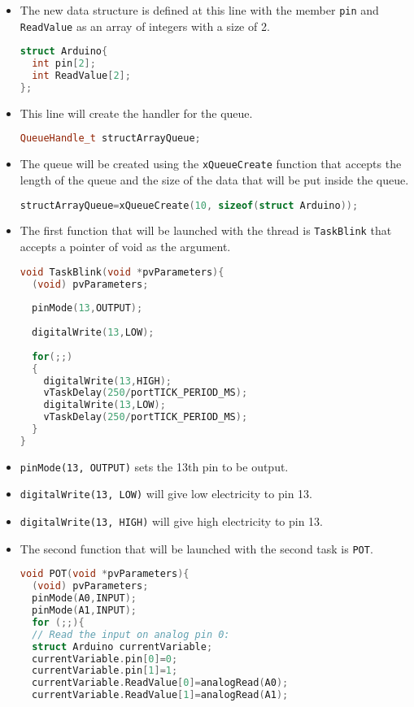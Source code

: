 \documentclass{article}
\begin{document}
\begin{itemize}
    \item The new data structure is defined at this line with the member \texttt{pin} and \texttt{ReadValue} as an array of integers with a size of 2.
\begin{lstlisting}[language=C++,basicstyle=\ttfamily\footnotesize]
struct Arduino{
  int pin[2];
  int ReadValue[2];
};
\end{lstlisting}

    \item This line will create the handler for the queue.
\begin{lstlisting}[language=C++,basicstyle=\ttfamily\footnotesize]
QueueHandle_t structArrayQueue;
\end{lstlisting}

    \item The queue will be created using the \texttt{xQueueCreate} function that accepts the length of the queue and the size of the data that will be put inside the queue.
\begin{lstlisting}[language=C++,basicstyle=\ttfamily\footnotesize]
structArrayQueue=xQueueCreate(10, sizeof(struct Arduino));
\end{lstlisting}

    \item The first function that will be launched with the thread is \texttt{TaskBlink} that accepts a pointer of void as the argument.
\begin{lstlisting}[language=C++,basicstyle=\ttfamily\footnotesize]
void TaskBlink(void *pvParameters){
  (void) pvParameters;
  
  pinMode(13,OUTPUT);
  
  digitalWrite(13,LOW);
  
  for(;;)
  {
    digitalWrite(13,HIGH);
    vTaskDelay(250/portTICK_PERIOD_MS);
    digitalWrite(13,LOW);
    vTaskDelay(250/portTICK_PERIOD_MS);
  }
}
\end{lstlisting}

    \item \texttt{pinMode(13, OUTPUT)} sets the 13th pin to be output.
    \item \texttt{digitalWrite(13, LOW)} will give low electricity to pin 13.
    \item \texttt{digitalWrite(13, HIGH)} will give high electricity to pin 13.

    \item The second function that will be launched with the second task is \texttt{POT}.
\begin{lstlisting}[language=C++,basicstyle=\ttfamily\footnotesize]
void POT(void *pvParameters){
  (void) pvParameters;
  pinMode(A0,INPUT);
  pinMode(A1,INPUT);
  for (;;){
  // Read the input on analog pin 0:
  struct Arduino currentVariable;
  currentVariable.pin[0]=0;
  currentVariable.pin[1]=1;
  currentVariable.ReadValue[0]=analogRead(A0);
  currentVariable.ReadValue[1]=analogRead(A1);  


\end{lstlisting}
\end{itemize}
\end{document}
